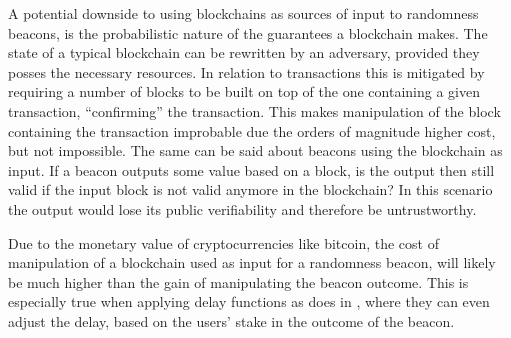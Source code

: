A potential downside to using blockchains as sources of input to randomness beacons, is the probabilistic nature of the guarantees a blockchain makes.
The state of a typical blockchain can be rewritten by an adversary, provided they posses the necessary resources.
In relation to transactions this is mitigated by requiring a number of blocks to be built on top of the one containing a given transaction, \enquote{confirming} the transaction.
This makes manipulation of the block containing the transaction improbable due the orders of magnitude higher cost, but not impossible.
The same can be said about beacons using the blockchain as input.
If a beacon outputs some value based on a block, is the output then still valid if the input block is not valid anymore in the blockchain?
In this scenario the output would lose its public verifiability and therefore be untrustworthy.

Due to the monetary value of cryptocurrencies like bitcoin, the cost of manipulation of a blockchain used as input for a randomness beacon, will likely be much higher than the gain of manipulating the beacon outcome.
This is especially true when applying delay functions as \citet{bunz2017proofsof} does in , where they can even adjust the delay, based on the users' stake in the outcome of the beacon.
